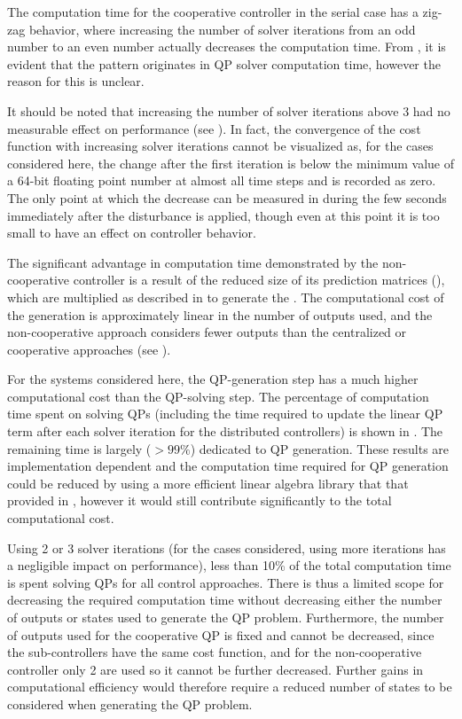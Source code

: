 The computation time for the cooperative controller in the serial case has a zig-zag behavior, where increasing the number of solver iterations from an odd number to an even number actually decreases the computation time.
From , it is evident that the pattern originates in QP solver computation time, however the reason for this is unclear.

It should be noted that increasing the number of solver iterations above 3 had no measurable effect on performance (see ).
In fact, the convergence of the cost function with increasing solver iterations cannot be visualized as, for the cases considered here, the change after the first iteration is below the minimum value of a 64-bit floating point number at almost all time steps and is recorded as zero.
The only point at which the decrease can be measured in during the few seconds immediately after the disturbance is applied, though even at this point it is too small to have an effect on controller behavior.

The significant advantage in computation time demonstrated by the non-cooperative controller is a result of the reduced size of its prediction matrices (), which are multiplied as described in  to generate the .
The computational cost of the  generation is approximately linear in the number of outputs used, and the non-cooperative approach considers fewer outputs than the centralized or cooperative approaches (see ).

For the systems considered here, the QP-generation step has a much higher computational cost than the QP-solving step.
The percentage of computation time spent on solving QPs (including the time required to update the linear QP term after each solver iteration for the distributed controllers) is shown in .
The remaining time is largely ($>99\%$) dedicated to QP generation.
These results are implementation dependent and the computation time required for QP generation could be reduced by using a more efficient linear algebra library that that provided in \eigen{}, however it would still contribute significantly to the total computational cost.

Using 2 or 3 solver iterations (for the cases considered, using more iterations has a negligible impact on performance), less than 10\% of the total computation time is spent solving QPs for all control approaches. 
There is thus a limited scope for decreasing the required computation time without decreasing either the number of outputs or states used to generate the QP problem.
Furthermore, the number of outputs used for the cooperative QP is fixed and cannot be decreased, since the sub-controllers have the same cost function, and for the non-cooperative controller only 2 are used so it cannot be further decreased.
Further gains in computational efficiency would therefore require a reduced number of states to be considered when generating the QP problem.

